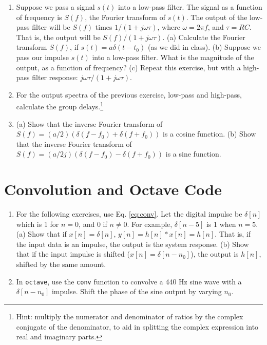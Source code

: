 \documentclass{article}
\begin{document}
\begin{enumerate}
\item Suppose we pass a signal $s(t)$ into a low-pass filter.  The signal as a function of frequency is $S(f)$, the Fourier transform of $s(t)$.  The output of the low-pass filter will be $S(f)$ times $1/(1+j\omega \tau)$, where $\omega = 2\pi f$, and $\tau = RC$.  That is, the output will be $S(f)/(1+j\omega \tau)$.  (a) Calculate the Fourier transform $S(f)$, if $s(t) = a\delta(t-t_0)$ (as we did in class).  (b) Suppose we pass our impulse $s(t)$ into a low-pass filter.  What is the magnitude of the output, as a function of frequency? (c) Repeat this exercise, but with a high-pass filter response: $j\omega\tau/(1+j\omega \tau)$. \\ \vspace{4cm}
\item For the output spectra of the previous exercise, low-pass and high-pass, calculate the group delays.\footnote{Hint: multiply the numerator and denominator of ratios by the complex conjugate of the denominator, to aid in splitting the complex expression into real and imaginary parts.} \\ \vspace{4cm}
\item (a) Show that the inverse Fourier transform of $S(f) = (a/2)(\delta(f-f_0) + \delta(f+f_0))$ is a cosine function. (b) Show that the inverse Fourier transform of $S(f) = (a/2j)(\delta(f-f_0) - \delta(f+f_0))$ is a sine function. \ \vspace{4cm}
\end{enumerate}

\section{Convolution and Octave Code}

\begin{enumerate}
\item For the following exercises, use Eq. \ref{eq:conv}. Let the digital impulse be $\delta[n]$ which is 1 for $n=0$, and 0 if $n\neq 0$.  For example, $\delta[n-5]$ is 1 when $n=5$. (a) Show that if $x[n] = \delta[n]$, $y[n] = h[n] * x[n] = h[n]$.  That is, if the input data is an impulse, the output is the system response. (b) Show that if the input impulse is shifted ($x[n] = \delta[n-n_0]$), the output is $h[n]$, shifted by the same amount. \\ \vspace{4cm}
\item In \verb+octave+, use the \verb+conv+ function to convolve a 440 Hz sine wave with a $\delta[n-n_0]$ impulse.  Shift the phase of the sine output by varying $n_0$.
\end{enumerate}
\end{document}
